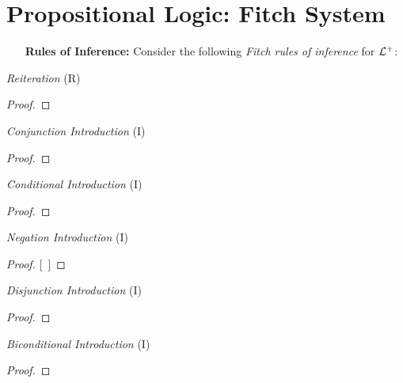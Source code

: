 \documentclass[a4paper, 11pt]{article} %
\begin{document}
\section*{\sc Propositional Logic: Fitch System}

\begin{enumerate}[leftmargin=1.2in,labelsep=.15in] %
  \item[\bf Rules of Inference:] Consider the following \textit{Fitch rules of inference} for $\mathcal{L}^+$:
\end{enumerate}

\begin{multicols}{2}\footnotesize

  \textit{Reiteration} (R)
  \begin{proof}
     
  \end{proof}
  \medskip

  \textit{Conjunction Introduction} (\eand I)
  \begin{proof}
     
     
  \end{proof}
  \medskip

  \textit{Conditional Introduction} (\eif I)
  \begin{proof}
    \open
    \close
  \end{proof}
  \medskip

  \textit{Negation Introduction} (\enot I)
  \begin{proof}
  \open
    \metaA {}   %
    \metaB
  \close
  [\ ]{\enot\metaA}
  \end{proof}
  \medskip

  \textit{Disjunction Introduction} (\eor I)
  \begin{proof}
  \end{proof}
  \medskip

  \textit{Biconditional Introduction} (\eiff I)
  \begin{proof}
    \open
       
    \close
    \open
       
    \close
  \end{proof}
  \medskip


\end{multicols}
\end{document}
